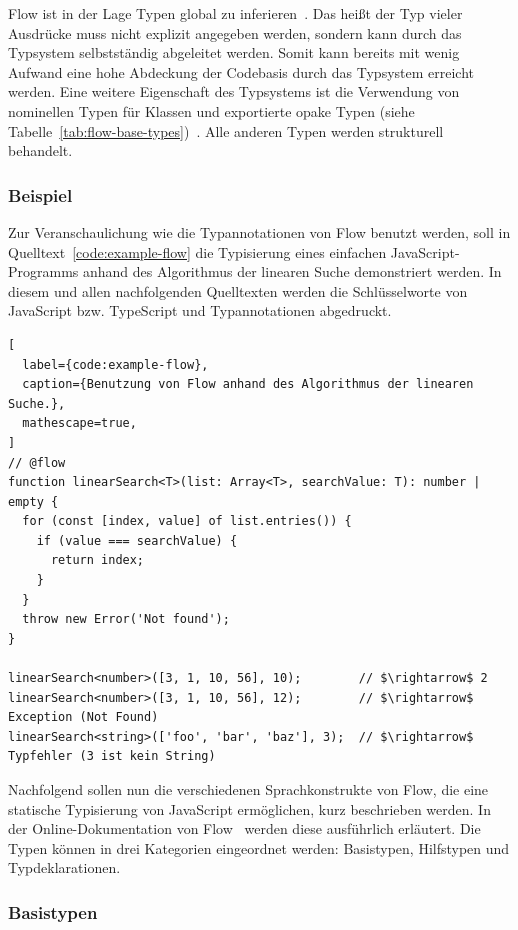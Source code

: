 Flow ist in der Lage Typen global zu inferieren~\autocite[25]{FLOW:PAPER}. Das heißt der Typ vieler Ausdrücke muss nicht explizit angegeben werden, sondern kann durch das Typsystem selbstständig abgeleitet werden. Somit kann bereits mit wenig Aufwand eine hohe Abdeckung der Codebasis durch das Typsystem erreicht werden. Eine weitere Eigenschaft des Typsystems ist die Verwendung von nominellen Typen für Klassen und exportierte opake Typen (siehe Tabelle~\ref{tab:flow-base-types})~\autocite{FLOW:NOMINAL_TYPES}. Alle anderen Typen werden strukturell behandelt.

\subsubsection{Beispiel}

Zur Veranschaulichung wie die Typannotationen von Flow benutzt werden, soll in Quelltext~\ref{code:example-flow} die Typisierung eines einfachen JavaScript-Programms anhand des Algorithmus der linearen Suche demonstriert werden. In diesem und allen nachfolgenden Quelltexten werden die Schlüsselworte von JavaScript bzw. TypeScript  und Typannotationen  abgedruckt.

\begin{lstlisting}[
  label={code:example-flow},
  caption={Benutzung von Flow anhand des Algorithmus der linearen Suche.},
  mathescape=true,
]
// @flow
function linearSearch<T>(list: Array<T>, searchValue: T): number | empty {
  for (const [index, value] of list.entries()) {
    if (value === searchValue) {
      return index;
    }
  }
  throw new Error('Not found');
}

linearSearch<number>([3, 1, 10, 56], 10);        // $\rightarrow$ 2
linearSearch<number>([3, 1, 10, 56], 12);        // $\rightarrow$ Exception (Not Found)
linearSearch<string>(['foo', 'bar', 'baz'], 3);  // $\rightarrow$ Typfehler (3 ist kein String)
\end{lstlisting}

Nachfolgend sollen nun die verschiedenen Sprachkonstrukte von Flow, die eine statische Typisierung von JavaScript ermöglichen, kurz beschrieben werden. In der Online-Dokumentation von Flow~\autocite{FLOW:TYPE_ANNOTATIONS} werden diese ausführlich erläutert. Die Typen können in drei Kategorien eingeordnet werden: Basistypen, Hilfstypen und Typdeklarationen.


\subsubsection{Basistypen}
\label{subsec:flow:base-types}


